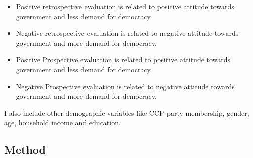 \documentclass[12pt]{article}\usepackage[]{graphicx}\usepackage[]{color}
\begin{document}
\begin{itemize}
	\item Positive retrospective evaluation is related to positive attitude towards government and less demand for democracy.
	\item Negative retrospective evaluation is related to negative attitude towards government and more demand for democracy.
	\item Positive Prospective evaluation is related to positive attitude towards government and less demand for democracy.
	\item Negative Prospective evaluation is related to negative attitude towards government and more demand for democracy.
\end{itemize}

I also include other demographic variables like CCP party membership, gender, age, household income and education.







\subsection{Method}







\nocite{YangTang2010,JiangYang2015}
\end{document}
